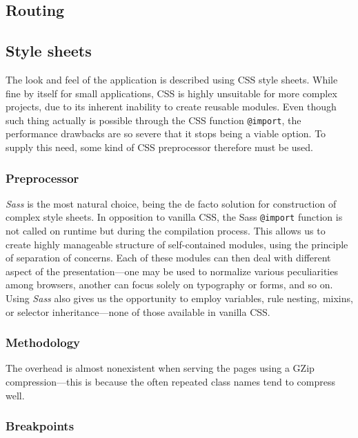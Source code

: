 \documentclass[thesis=M,english,hidelinks]{FITthesis}[2012/10/20]
\newcommand{\code}{\texttt}
\begin{document}
  \subsection{Routing}

  \subsection{Style sheets}

The look and feel of the application is described using CSS style sheets. While fine by itself for small applications, CSS is highly unsuitable for more complex projects, due to its inherent inability to create reusable modules. Even though such thing actually is possible through the CSS function \code{@import}, the performance drawbacks are so severe that it stops being a viable option. To supply this need, some kind of CSS preprocessor therefore must be used.

    \subsubsection{Preprocessor}

\textit{Sass} is the most natural choice, being the de facto solution for construction of complex style sheets. In opposition to vanilla CSS, the Sass \code{@import} function is not called on runtime but during the compilation process. This allows us to create highly manageable structure of self-contained modules, using the principle of separation of concerns. Each of these modules can then deal with different aspect of the presentation---one may be used to normalize various peculiarities among browsers, another can focus solely on typography or forms, and so on. Using \textit{Sass} also gives us the opportunity to employ variables, rule nesting, mixins, or selector inheritance---none of those available in vanilla CSS.

    \subsubsection{Methodology}



The overhead is almost nonexistent when serving the pages using a GZip compression---this is because the often repeated class names tend to compress well.

    \subsubsection{Breakpoints}
\end{document}

